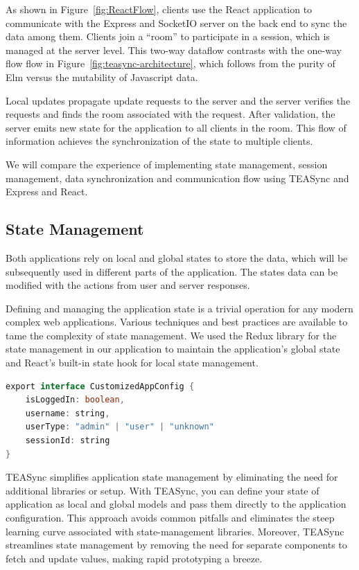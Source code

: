 As shown in Figure~\ref{fig:ReactFlow}, clients use the React application to communicate with the Express and SocketIO server on the back end to sync the data among them. Clients join a ``room'' to participate in a session, which is managed at the server level. 
This two-way dataflow contrasts with the one-way flow flow in Figure~\ref{fig:teasync-architecture}, 
which follows from the purity of Elm versus the mutability of Javascript data.

Local updates propagate update requests to the server and the server verifies the requests and finds the room associated with the request.
After validation, the server emits new state for the application to all clients in the room.
This flow of information achieves the synchronization of the state to multiple clients.

We will compare the experience of implementing state management, session management, data synchronization and communication flow using TEASync and Express and React.

\subsection{State Management}

Both applications rely on local and global states to store the data, which will be subsequently used in different parts of the application. The states data can be modified with the actions from user and server responses. 


Defining and managing the application state is a trivial operation for any modern complex web applications. Various techniques and best practices are available to tame the complexity of state management. We used the Redux\cite{redux} library for the state management in our application to maintain the application’s global state and React’s built-in state hook for local state management. 

\begin{lstlisting}[language=Java, caption=Calendar State in React Application, label=lst:java, mathescape=true]
export interface CustomizedAppConfig {
    isLoggedIn: boolean,
    username: string,
    userType: "admin" | "user" | "unknown"
    sessionId: string
}
\end{lstlisting}

TEASync simplifies application state management by eliminating the need for additional libraries or setup. With TEASync, you can define your state of application as local and global models and pass them directly to the application configuration. This approach avoids common pitfalls and eliminates the steep learning curve associated with state-management libraries. Moreover, TEASync streamlines state management by removing the need for separate components to fetch and update values, making rapid prototyping a breeze.

